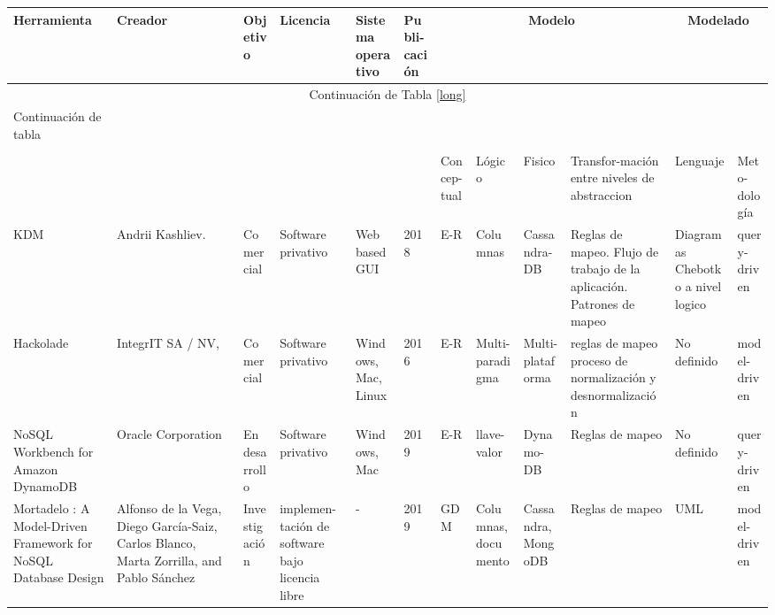 
\begin{landscape}
	
	\begin{longtable}{  p{2.1cm}| p{1.7cm}| l| p{1.8cm}| p{1.7cm}|  p{1.1cm}| p{1.2cm}| p{1.7cm}| p{1.9cm}| p{1.6cm}| p{1.5cm}| p{1.5cm}  }
		
		
		\hline
		
		\textbf{Herramienta} & \textbf{Creador} & \textbf{Objetivo} & \textbf{Licencia}& \textbf{Sistema operativo} & \textbf{Publi-cación } & \multicolumn{4}{|c|}{\textbf{Modelo}}  & \multicolumn{2}{|c}{\textbf{Modelado}}\\
		
		\endfirsthead
		
		\multicolumn{12}{c}{Continuación de Tabla \ref{long}}\\
		\hline
		Continuación de tabla\\
		\hline
		\endhead
		
		\hline
		\endfoot
		
		\hline
		\multicolumn{12}{ c }{Fin de Tabla}\\
		\hline%
		\endlastfoot
		
		
		&  &  &  &  &  & Concep-tual & Lógico & Fisico &  
		Transfor-mación entre niveles de abstraccion
		& Lenguaje & Meto-dología\\
		\hline
		
		KDM & Andrii Kashliev. & Comercial & Software privativo & Web based GUI & 2018 & E-R & Columnas & Cassandra-DB& Reglas de mapeo. Flujo de trabajo de la aplicación. Patrones de mapeo & Diagramas Chebotko a nivel logico & query-driven\\
		
		
		
		Hackolade & IntegrIT SA / NV, & Comercial & Software privativo & Windows, Mac, Linux & 2016 & E-R & Multi-paradigma & Multi-plataforma & reglas de mapeo proceso de  normalización y desnormalización& No definido & model-driven \\
		
		NoSQL Workbench for Amazon DynamoDB & Oracle Corporation & En desarrollo & Software privativo & Windows, Mac & 2019 & E-R & llave- valor & Dynamo-DB & Reglas de mapeo & No definido &  query-driven \\
		
		
		Mortadelo : A Model-Driven Framework for NoSQL Database Design &  
		Alfonso de la Vega, Diego García-Saiz, Carlos Blanco, Marta Zorrilla, and Pablo Sánchez & Investigación &  
		implemen-tación de software bajo licencia libre & - & 2019 & GDM &  Columnas, documento &  
		Cassandra, MongoDB &  Reglas de mapeo & UML & model-driven  \\
		

\end{longtable}
\end{landscape}
